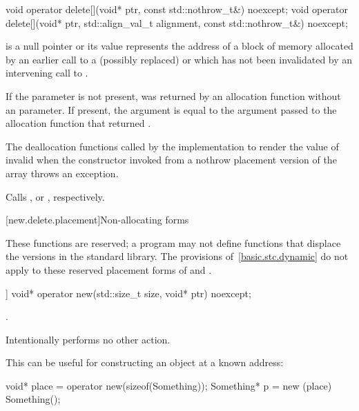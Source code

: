 %
\begin{itemdecl}
void operator delete[](void* ptr, const std::nothrow_t&) noexcept;
void operator delete[](void* ptr, std::align_val_t alignment, const std::nothrow_t&) noexcept;
\end{itemdecl}

\begin{itemdescr}
\pnum
\expects
{} is a null pointer or
its value represents the address of
a block of memory allocated by
an earlier call to a (possibly replaced)
or
which has not been invalidated by an intervening call to
.

\pnum
If the  parameter is not present,
 was returned by an allocation function
without an  parameter.
If present, the  argument
is equal to the  argument
passed to the allocation function that returned .

\pnum
\effects
The
deallocation functions
called by the implementation
to render the value of  invalid
when the constructor invoked from a nothrow
placement version of the array  throws an exception.

\pnum
\replaceable
{}

\pnum
{}
Calls ,
or ,
respectively.
\end{itemdescr}

[new.delete.placement]{Non-allocating forms}

\pnum
These functions are reserved; a \Cpp{} program may not define functions that displace
the versions in the \Cpp{} standard library.
The provisions of~\ref{basic.stc.dynamic} do not apply to these reserved
placement forms of  and .

%
\begin{itemdecl}
[[nodiscard]] void* operator new(std::size_t size, void* ptr) noexcept;
\end{itemdecl}

\begin{itemdescr}
\pnum
\returns
{}.

\pnum
\remarks
Intentionally performs no other action.

\pnum
\begin{example}
This can be useful for constructing an object at a known address:
\begin{codeblock}
void* place = operator new(sizeof(Something));
Something* p = new (place) Something();
\end{codeblock}
\end{example}
\end{itemdescr}

